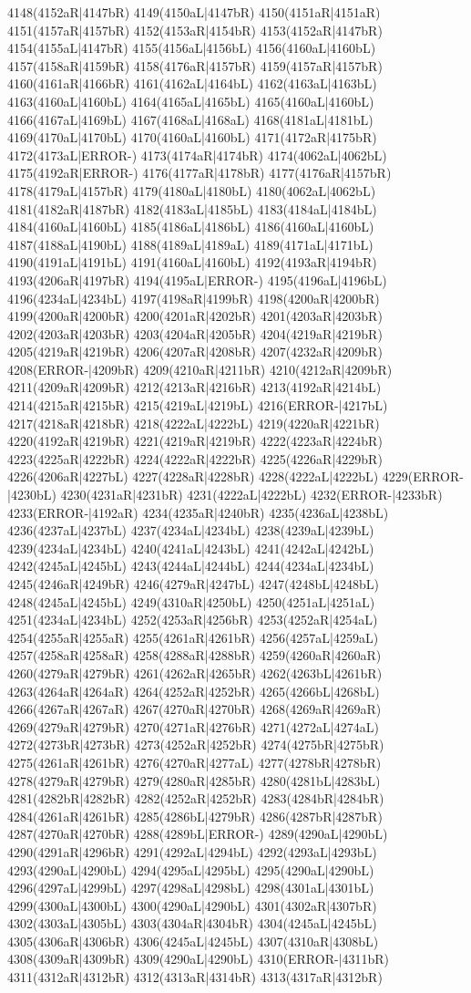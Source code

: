 4148(4152aR|4147bR) 4149(4150aL|4147bR) 4150(4151aR|4151aR) 4151(4157aR|4157bR) 4152(4153aR|4154bR) 4153(4152aR|4147bR) 4154(4155aL|4147bR) 4155(4156aL|4156bL) 4156(4160aL|4160bL) 4157(4158aR|4159bR) 4158(4176aR|4157bR) 4159(4157aR|4157bR) 4160(4161aR|4166bR) 4161(4162aL|4164bL) 4162(4163aL|4163bL) 4163(4160aL|4160bL) 4164(4165aL|4165bL) 4165(4160aL|4160bL) 4166(4167aL|4169bL) 4167(4168aL|4168aL) 4168(4181aL|4181bL) 4169(4170aL|4170bL) 4170(4160aL|4160bL) 4171(4172aR|4175bR) 4172(4173aL|ERROR-) 4173(4174aR|4174bR) 4174(4062aL|4062bL) 4175(4192aR|ERROR-) 4176(4177aR|4178bR) 4177(4176aR|4157bR) 4178(4179aL|4157bR) 4179(4180aL|4180bL) 4180(4062aL|4062bL) 4181(4182aR|4187bR) 4182(4183aL|4185bL) 4183(4184aL|4184bL) 4184(4160aL|4160bL) 4185(4186aL|4186bL) 4186(4160aL|4160bL) 4187(4188aL|4190bL) 4188(4189aL|4189aL) 4189(4171aL|4171bL) 4190(4191aL|4191bL) 4191(4160aL|4160bL) 4192(4193aR|4194bR) 4193(4206aR|4197bR) 4194(4195aL|ERROR-) 4195(4196aL|4196bL) 4196(4234aL|4234bL) 4197(4198aR|4199bR) 4198(4200aR|4200bR) 4199(4200aR|4200bR) 4200(4201aR|4202bR) 4201(4203aR|4203bR) 4202(4203aR|4203bR) 4203(4204aR|4205bR) 4204(4219aR|4219bR) 4205(4219aR|4219bR) 4206(4207aR|4208bR) 4207(4232aR|4209bR) 4208(ERROR-|4209bR) 4209(4210aR|4211bR) 4210(4212aR|4209bR) 4211(4209aR|4209bR) 4212(4213aR|4216bR) 4213(4192aR|4214bL) 4214(4215aR|4215bR) 4215(4219aL|4219bL) 4216(ERROR-|4217bL) 4217(4218aR|4218bR) 4218(4222aL|4222bL) 4219(4220aR|4221bR) 4220(4192aR|4219bR) 4221(4219aR|4219bR) 4222(4223aR|4224bR) 4223(4225aR|4222bR) 4224(4222aR|4222bR) 4225(4226aR|4229bR) 4226(4206aR|4227bL) 4227(4228aR|4228bR) 4228(4222aL|4222bL) 4229(ERROR-|4230bL) 4230(4231aR|4231bR) 4231(4222aL|4222bL) 4232(ERROR-|4233bR) 4233(ERROR-|4192aR) 4234(4235aR|4240bR) 4235(4236aL|4238bL) 4236(4237aL|4237bL) 4237(4234aL|4234bL) 4238(4239aL|4239bL) 4239(4234aL|4234bL) 4240(4241aL|4243bL) 4241(4242aL|4242bL) 4242(4245aL|4245bL) 4243(4244aL|4244bL) 4244(4234aL|4234bL) 4245(4246aR|4249bR) 4246(4279aR|4247bL) 4247(4248bL|4248bL) 4248(4245aL|4245bL) 4249(4310aR|4250bL) 4250(4251aL|4251aL) 4251(4234aL|4234bL) 4252(4253aR|4256bR) 4253(4252aR|4254aL) 4254(4255aR|4255aR) 4255(4261aR|4261bR) 4256(4257aL|4259aL) 4257(4258aR|4258aR) 4258(4288aR|4288bR) 4259(4260aR|4260aR) 4260(4279aR|4279bR) 4261(4262aR|4265bR) 4262(4263bL|4261bR) 4263(4264aR|4264aR) 4264(4252aR|4252bR) 4265(4266bL|4268bL) 4266(4267aR|4267aR) 4267(4270aR|4270bR) 4268(4269aR|4269aR) 4269(4279aR|4279bR) 4270(4271aR|4276bR) 4271(4272aL|4274aL) 4272(4273bR|4273bR) 4273(4252aR|4252bR) 4274(4275bR|4275bR) 4275(4261aR|4261bR) 4276(4270aR|4277aL) 4277(4278bR|4278bR) 4278(4279aR|4279bR) 4279(4280aR|4285bR) 4280(4281bL|4283bL) 4281(4282bR|4282bR) 4282(4252aR|4252bR) 4283(4284bR|4284bR) 4284(4261aR|4261bR) 4285(4286bL|4279bR) 4286(4287bR|4287bR) 4287(4270aR|4270bR) 4288(4289bL|ERROR-) 4289(4290aL|4290bL) 4290(4291aR|4296bR) 4291(4292aL|4294bL) 4292(4293aL|4293bL) 4293(4290aL|4290bL) 4294(4295aL|4295bL) 4295(4290aL|4290bL) 4296(4297aL|4299bL) 4297(4298aL|4298bL) 4298(4301aL|4301bL) 4299(4300aL|4300bL) 4300(4290aL|4290bL) 4301(4302aR|4307bR) 4302(4303aL|4305bL) 4303(4304aR|4304bR) 4304(4245aL|4245bL) 4305(4306aR|4306bR) 4306(4245aL|4245bL) 4307(4310aR|4308bL) 4308(4309aR|4309bR) 4309(4290aL|4290bL) 4310(ERROR-|4311bR) 4311(4312aR|4312bR) 4312(4313aR|4314bR) 4313(4317aR|4312bR) 